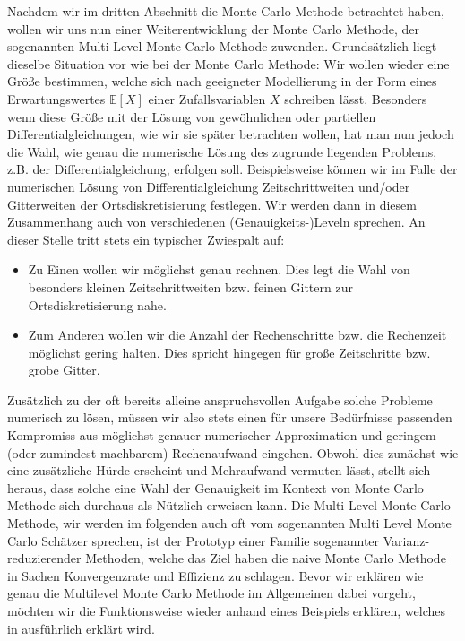 
Nachdem wir im dritten Abschnitt die Monte Carlo Methode betrachtet haben, wollen wir uns nun einer Weiterentwicklung der Monte Carlo Methode, der sogenannten Multi Level Monte Carlo Methode zuwenden. Grundsätzlich liegt dieselbe Situation vor wie bei der Monte Carlo Methode:
Wir wollen wieder eine Größe bestimmen, welche sich nach geeigneter Modellierung in der Form eines Erwartungswertes $ \mathbb{E}[X] $ einer Zufallsvariablen $ X $ schreiben lässt. Besonders wenn diese Größe mit der Lösung von gewöhnlichen oder partiellen Differentialgleichungen, wie wir sie später betrachten wollen, hat man nun jedoch die Wahl, wie genau die numerische Lösung des zugrunde liegenden Problems, z.B. der Differentialgleichung, erfolgen soll. Beispielsweise können wir im Falle der numerischen Lösung von Differentialgleichung Zeitschrittweiten und/oder Gitterweiten der Ortsdiskretisierung festlegen. Wir werden dann in diesem Zusammenhang auch von verschiedenen (Genauigkeits-)Leveln sprechen. An dieser Stelle tritt stets ein typischer Zwiespalt auf:
\begin{itemize}
	\item Zu Einen wollen wir möglichst genau rechnen. Dies legt die Wahl von besonders kleinen Zeitschrittweiten bzw. feinen Gittern zur Ortsdiskretisierung nahe.
	\item Zum Anderen wollen wir die Anzahl der Rechenschritte bzw. die Rechenzeit möglichst gering halten. Dies spricht hingegen für große Zeitschritte bzw. grobe Gitter.
\end{itemize}
Zusätzlich zu der oft bereits alleine anspruchsvollen Aufgabe solche Probleme numerisch zu lösen, müssen wir also stets einen für unsere Bedürfnisse passenden Kompromiss aus möglichst genauer numerischer Approximation und geringem (oder zumindest machbarem) Rechenaufwand eingehen. Obwohl dies zunächst wie eine zusätzliche Hürde erscheint und Mehraufwand vermuten lässt, stellt sich heraus, dass solche eine Wahl der Genauigkeit im Kontext von Monte Carlo Methode sich durchaus als Nützlich erweisen kann. 
Die Multi Level Monte Carlo Methode, wir werden im folgenden auch oft vom sogenannten Multi Level Monte Carlo Schätzer sprechen, ist der Prototyp einer Familie sogenannter Varianz-reduzierender Methoden, welche das Ziel haben die naive Monte Carlo Methode in Sachen Konvergenzrate und Effizienz zu schlagen. Bevor wir erklären wie genau die Multilevel Monte Carlo Methode im Allgemeinen dabei vorgeht, möchten wir die Funktionsweise wieder anhand eines Beispiels erklären, welches in \cite{heinrich2001multilevel} ausführlich erklärt wird.

